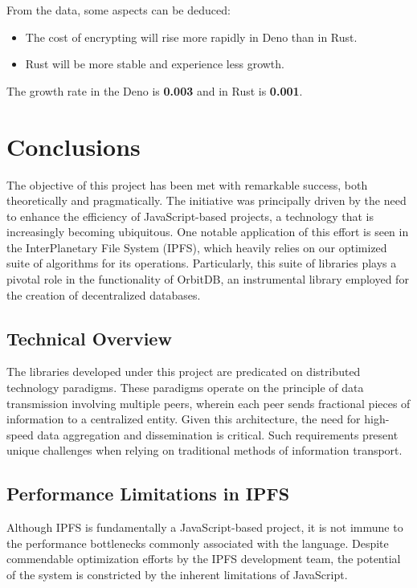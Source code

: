 \documentclass[10pt,journal,compsoc]{IEEEtran}
\begin{document}
From the data, some aspects can be deduced:
\begin{itemize}
    \item The cost of encrypting will rise more rapidly in Deno than in Rust.
    \item Rust will be more stable and experience less growth.
\end{itemize}

The growth rate in the Deno is \textbf{0.003} and in Rust is \textbf{0.001}.

\section{Conclusions}

The objective of this project has been met with remarkable success, both theoretically and pragmatically. The initiative was principally driven by the need to enhance the efficiency of JavaScript-based projects, a technology that is increasingly becoming ubiquitous. One notable application of this effort is seen in the InterPlanetary File System (IPFS), which heavily relies on our optimized suite of algorithms for its operations. Particularly, this suite of libraries plays a pivotal role in the functionality of OrbitDB, an instrumental library employed for the creation of decentralized databases.

\subsection{Technical Overview}

The libraries developed under this project are predicated on distributed technology paradigms. These paradigms operate on the principle of data transmission involving multiple peers, wherein each peer sends fractional pieces of information to a centralized entity. Given this architecture, the need for high-speed data aggregation and dissemination is critical. Such requirements present unique challenges when relying on traditional methods of information transport.

\subsection{Performance Limitations in IPFS}

Although IPFS is fundamentally a JavaScript-based project, it is not immune to the performance bottlenecks commonly associated with the language. Despite commendable optimization efforts by the IPFS development team, the potential of the system is constricted by the inherent limitations of JavaScript.
\end{document}
